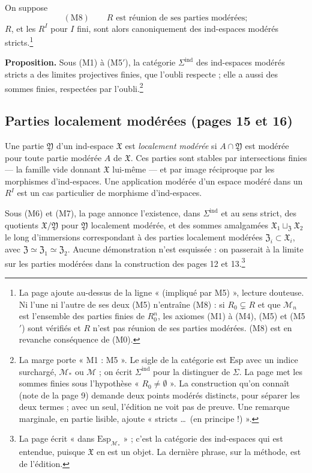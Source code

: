 \documentclass[11pt,a4paper]{article}
\begin{document}
On suppose
\[ (\mathrm{M}8) \qquad R \text{ est réunion de ses parties modérées} ; \]
$R$, et les $R^I$ pour $I$ fini, sont alors canoniquement des ind-espaces
modérés stricts.\footnote{La page ajoute au-dessus de la ligne « (impliqué par
M5) », lecture douteuse. Ni l'une ni l'autre de ses deux (M5) n'entraîne (M8) :
si $R_0 \subsetneq R$ et que $\mathcal{M}_n$ est l'ensemble des parties finies
de $R_0^n$, les axiomes (M1) à (M4), (M5) et (M5$'$) sont vérifiés et $R$ n'est
pas réunion de ses parties modérées. (M8) est en revanche conséquence de
(M0).}

\textbf{Proposition.} Sous (M1) à (M5$'$), la catégorie $\Sigma^{\mathrm{ind}}$
des ind-espaces modérés stricts a des limites projectives finies, que l'oubli
respecte ; elle a aussi des sommes finies, respectées par l'oubli.\footnote{La
marge porte « M1 : M5 ». Le sigle de la catégorie est $\mathrm{Esp}$ avec un
indice surchargé, $\mathcal{M}_*$ ou $\mathcal{M}$ ; on écrit
$\Sigma^{\mathrm{ind}}$ pour la distinguer de $\Sigma$. La page met les sommes
finies sous l'hypothèse « $R_0 \neq \emptyset$ ». La construction qu'on connaît
(note de la page 9) demande deux points modérés distincts, pour séparer les
deux termes ; avec un seul, l'édition ne voit pas de preuve. Une remarque
marginale, en partie lisible, ajoute « stricts \ldots\ (en principe !) ».}

\subsection*{Parties localement modérées (pages 15 et 16)}

Une partie $\mathfrak{Y}$ d'un ind-espace $\mathfrak{X}$ est \emph{localement
modérée} si $A \cap \mathfrak{Y}$ est modérée pour toute partie modérée $A$ de
$\mathfrak{X}$. Ces parties sont stables par intersections finies — la
famille vide donnant $\mathfrak{X}$ lui-même — et par image réciproque par les
morphismes d'ind-espaces. Une application modérée d'un espace modéré dans un
$R^I$ est un cas particulier de morphisme d'ind-espaces.

Sous (M6) et (M7), la page annonce l'existence, dans $\Sigma^{\mathrm{ind}}$ et
au sens strict, des quotients $\mathfrak{X}/\mathfrak{Y}$ pour $\mathfrak{Y}$
localement modérée, et des sommes amalgamées $\mathfrak{X}_1
\sqcup_{\mathfrak{Z}} \mathfrak{X}_2$ le long d'immersions correspondant à des
parties localement modérées $\mathfrak{Z}_i \subset \mathfrak{X}_i$, avec
$\mathfrak{Z} \simeq \mathfrak{Z}_1 \simeq \mathfrak{Z}_2$. Aucune démonstration
n'est esquissée : on passerait à la limite sur les parties modérées dans la
construction des pages 12 et 13.\footnote{La page écrit « dans
$\mathrm{Esp}_{\mathcal{M}_*}$ » ; c'est la catégorie des ind-espaces qui est
entendue, puisque $\mathfrak{X}$ en est un objet. La dernière phrase, sur la
méthode, est de l'édition.}
\end{document}

